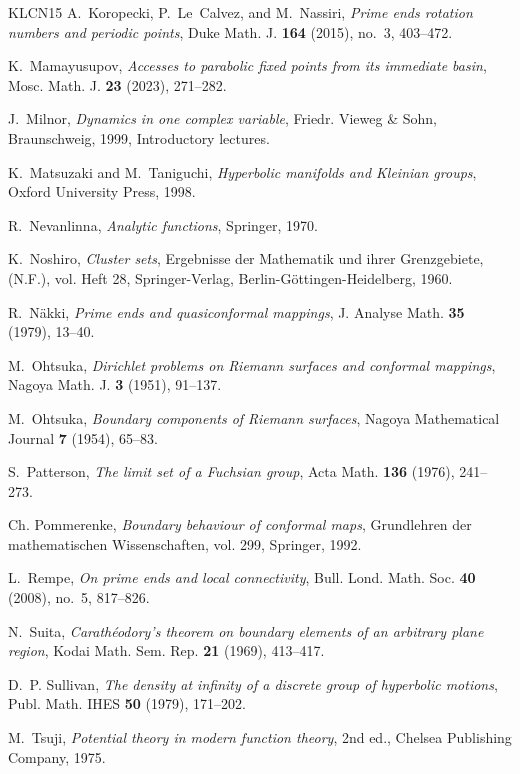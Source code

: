\documentclass[11pt,a4paper,reqno]{amsart}
\theoremstyle{plain}
\theoremstyle{definition}
\theoremstyle{plain}
\begin{document}
\begin{thebibliography}{KLCN15}
A.~Koropecki, P.~Le~Calvez, and M.~Nassiri, \emph{Prime ends rotation numbers
  and periodic points}, Duke Math. J. \textbf{164} (2015), no.~3, 403--472.

K.~Mamayusupov, \emph{Accesses to parabolic fixed points from its immediate
  basin}, Mosc. Math. J. \textbf{23} (2023), 271--282.

J.~Milnor, \emph{Dynamics in one complex variable}, Friedr. Vieweg \& Sohn,
  Braunschweig, 1999, Introductory lectures.

K.~Matsuzaki and M.~Taniguchi, \emph{Hyperbolic manifolds and {K}leinian
  groups}, Oxford University Press, 1998.

R.~Nevanlinna, \emph{Analytic functions}, Springer, 1970.

K.~Noshiro, \emph{Cluster sets}, Ergebnisse der Mathematik und ihrer
  Grenzgebiete, (N.F.), vol. Heft 28, Springer-Verlag,
  Berlin-G\"{o}ttingen-Heidelberg, 1960.

R.~Näkki, \emph{Prime ends and quasiconformal mappings}, J. Analyse Math.
  \textbf{35} (1979), 13--40.

M.~Ohtsuka, \emph{Dirichlet problems on {R}iemann surfaces and conformal
  mappings}, Nagoya Math. J. \textbf{3} (1951), 91--137.

M.~Ohtsuka, \emph{Boundary components of {R}iemann surfaces}, Nagoya
  Mathematical Journal \textbf{7} (1954), 65--83.

S.~Patterson, \emph{The limit set of a {F}uchsian group}, Acta Math.
  \textbf{136} (1976), 241--273.

Ch. Pommerenke, \emph{Boundary behaviour of conformal maps}, Grundlehren der
  mathematischen Wissenschaften, vol. 299, Springer, 1992.

L.~Rempe, \emph{On prime ends and local connectivity}, Bull. Lond. Math. Soc.
  \textbf{40} (2008), no.~5, 817--826.

N.~Suita, \emph{Carath\'{e}odory's theorem on boundary elements of an arbitrary
  plane region}, Kodai Math. Sem. Rep. \textbf{21} (1969), 413--417.

D.~P. Sullivan, \emph{The density at infinity of a discrete group of hyperbolic
  motions}, Publ. Math. IHES \textbf{50} (1979), 171--202.

M.~Tsuji, \emph{Potential theory in modern function theory}, 2nd ed., Chelsea
  Publishing Company, 1975.

\end{thebibliography}
\end{document}
